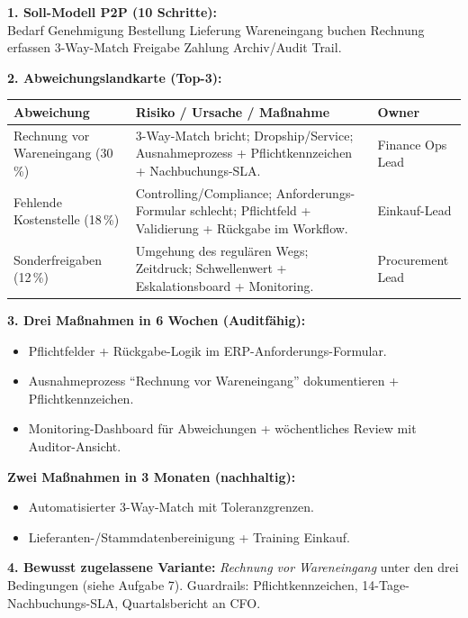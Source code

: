 \documentclass[11pt,a4paper,oneside]{article}
\begin{document}
\begin{loesungbox}
\textbf{1. Soll-Modell P2P (10 Schritte):}\\
Bedarf \textrightarrow{} Genehmigung \textrightarrow{} Bestellung \textrightarrow{} Lieferung \textrightarrow{} Wareneingang buchen \textrightarrow{} Rechnung erfassen \textrightarrow{} 3-Way-Match \textrightarrow{} Freigabe \textrightarrow{} Zahlung \textrightarrow{} Archiv/Audit Trail.

\smallskip
\textbf{2. Abweichungs\-landkarte (Top-3):}

\begin{tabularx}{\linewidth}{@{}p{3.4cm}|X|l@{}}
\toprule
\textbf{Abweichung} & \textbf{Risiko / Ursache / Ma{\ss}nahme} & \textbf{Owner} \\
\midrule
Rechnung vor Wareneingang (30\,\%) & 3-Way-Match bricht; Dropship/Service; Ausnahme\-prozess + Pflichtkennzeichen + Nachbuchungs-SLA. & Finance Ops Lead \\
\midrule
Fehlende Kostenstelle (18\,\%) & Controlling/Compliance; Anforderungs-Formular schlecht; Pflichtfeld + Validierung + R\"uckgabe im Workflow. & Einkauf-Lead \\
\midrule
Sonderfreigaben (12\,\%) & Umgehung des regul\"aren Wegs; Zeitdruck; Schwellenwert + Eskalations\-board + Monitoring. & Procurement Lead \\
\bottomrule
\end{tabularx}

\smallskip
\textbf{3. Drei Ma{\ss}nahmen in 6 Wochen (Auditf\"ahig):}
\begin{itemize}
  \item Pflichtfelder + R\"uckgabe-Logik im ERP-Anforderungs-Formular.
  \item Ausnahmeprozess ``Rechnung vor Wareneingang'' dokumentieren + Pflichtkennzeichen.
  \item Monitoring-Dashboard f\"ur Abweichungen + w\"ochentliches Review mit Auditor-Ansicht.
\end{itemize}

\smallskip
\textbf{Zwei Ma{\ss}nahmen in 3 Monaten (nachhaltig):}
\begin{itemize}
  \item Automatisierter 3-Way-Match mit Toleranzgrenzen.
  \item Lieferanten-/Stammdaten\-bereinigung + Training Einkauf.
\end{itemize}

\smallskip
\textbf{4. Bewusst zugelassene Variante:} \emph{Rechnung vor Wareneingang} unter den drei Bedingungen (siehe Aufgabe 7). Guardrails: Pflichtkennzeichen, 14-Tage-Nachbuchungs-SLA, Quartalsbericht an CFO.
\end{loesungbox}
\end{document}
